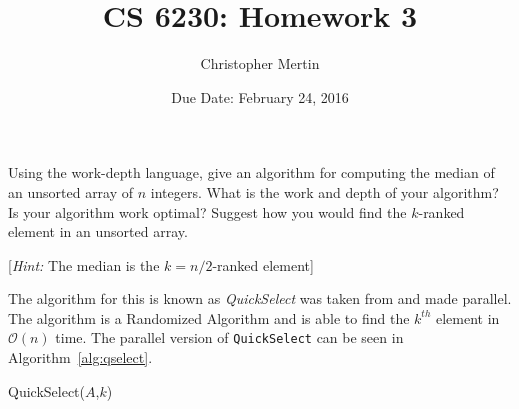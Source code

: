 \documentclass[addpoints]{exam}
\title{CS 6230: Homework 3}
\date{Due Date: February 24, 2016}
\author{Christopher Mertin}
\newcommand{\BigO}[1]{\mathcal{O}\left( #1\right)}
\begin{document}
\maketitle

\pointname{}
\bonuspointname{}
\pointformat{[\bfseries\thepoints]}

\printanswers



\begin{questions}

Using the work-depth language, give an algorithm for computing the median of an unsorted array of $n$ integers. What is the work and depth of your algorithm? Is your algorithm work optimal? Suggest how you would find the $k$-ranked element in an unsorted array.

[{\em Hint:} The median is the $k=n/2$-ranked element]

\begin{solution}
The algorithm for this is known as {\em QuickSelect} was taken from \cite{qselect} and made parallel. The algorithm is a Randomized Algorithm and is able to find the $k^{th}$ element in $\BigO{n}$ time. The parallel version of \verb~QuickSelect~ can be seen in Algorithm~\ref{alg:qselect}.

\begin{algorithm}[H]
\centering
\caption{QuickSelect($A$,$k$)}
\begin{algorithmic}[1]
    \ELSE
       \ELSE
       \ENDIF
   \ENDIF
\ENDFOR
{}
\ELSE
   \ELSE
   \ENDIF
\ENDIF
\end{algorithmic}
\label{alg:qselect}
\end{algorithm}


\end{solution}
\end{questions}
\end{document}
